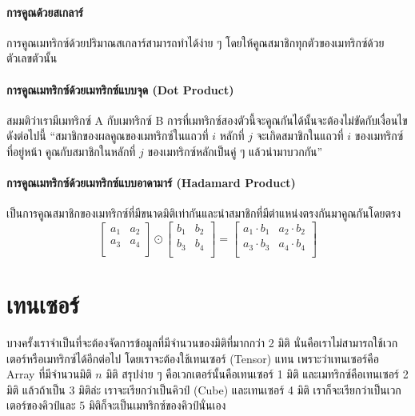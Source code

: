 \paragraph{การคูณด้วยสเกลาร์} การคูณเมทริกซ์ด้วยปริมาณสเกลาร์สามารถทำได้ง่าย ๆ โดยให้คูณสมาชิกทุกตัวของเมทริกซ์ด้วยตัวเลขตัวนั้น
%
\paragraph{การคูณเมทริกซ์ด้วยเมทริกซ์แบบจุด (Dot Product)} สมมติว่าเรามีเมทริกซ์ A กับเมทริกซ์ B การที่เมทริกซ์สองตัวนี้จะคูณกันได้นั้นจะต้องไม่ขัดกับเงื่อนไขดังต่อไปนี้ \enquote{สมาชิกของผลคูณของเมทริกซ์ในแถวที่ $i$ หลักที่ $j$ จะเกิดสมาชิกในแถวที่ $i$ ของเมทริกซ์ที่อยู่หน้า คูณกับสมาชิกในหลักที่ $j$ ของเมทริกซ์หลักเป็นคู่ ๆ แล้วนำมาบวกกัน}
%
\paragraph{การคูณเมทริกซ์ด้วยเมทริกซ์แบบอาดามาร์ (Hadamard Product)} เป็นการคูณสมาชิกของเมทริกซ์ที่มีขนาดมิติเท่ากันและนำสมาชิกที่มีตำแหน่งตรงกันมาคูณกันโดยตรง
%
\begin{equation}
    \begin{bmatrix}
        a_1 & a_2 \\
        a_3 & a_4 \\
    \end{bmatrix}
    \odot
    \begin{bmatrix}
        b_1 & b_2 \\
        b_3 & b_4 \\
    \end{bmatrix}
    =
    \begin{bmatrix}
        a_1 \cdot b_1 & a_2 \cdot b_2 \\
        a_3 \cdot b_3 & a_4 \cdot b_4 \\
    \end{bmatrix}
\end{equation}

\section{เทนเซอร์}
\label{sec:tensor}

บางครั้งเราจำเป็นที่จะต้องจัดการข้อมูลที่มีจำนวนของมิติที่มากกว่า 2 มิติ นั่นคือเราไม่สามารถใช้เวกเตอร์หรือเมทริกซ์ได้อีกต่อไป โดยเราจะต้องใช้เทนเซอร์ (Tensor) แทน เพราะว่าเทนเซอร์คือ Array ที่มีจำนวนมิติ $n$ มิติ สรุปง่าย ๆ คือเวกเตอร์นั้นคือเทนเซอร์ 1 มิติ และเมทริกซ์คือเทนเซอร์ 2 มิติ แล้วถ้าเป็น 3 มิติล่ะ เราจะเรียกว่าเป็นคิวป์ (Cube) และเทนเซอร์ 4 มิติ เราก็จะเรียกว่าเป็นเวกเตอร์ของคิวป์และ 5 มิติก็จะเป็นเมทริกซ์ของคิวป์นั่นเอง
